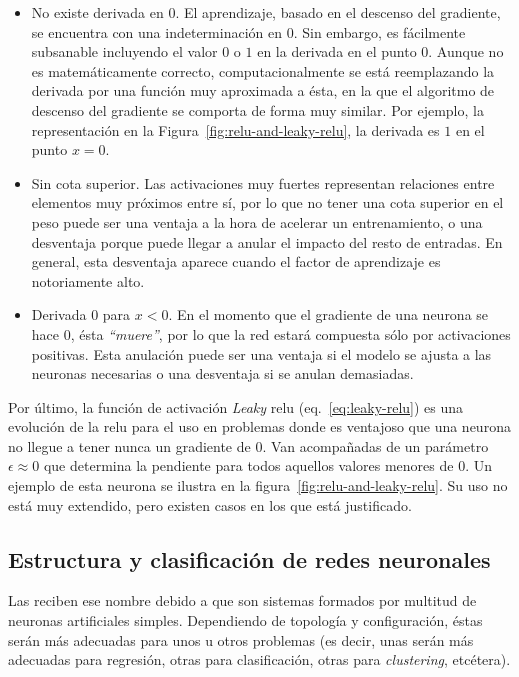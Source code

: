\begin{itemize}
	\item No existe derivada en $0$. El aprendizaje, basado en el descenso del gradiente, se encuentra con una indeterminación en $0$. Sin embargo, es fácilmente subsanable incluyendo el valor $0$ o $1$ en la derivada en el punto $0$. Aunque no es matemáticamente correcto, computacionalmente se está reemplazando la derivada por una función muy aproximada a ésta, en la que el algoritmo de descenso del gradiente se comporta de forma muy similar. Por ejemplo, la representación en la Figura~\ref{fig:relu-and-leaky-relu}, la derivada es $1$ en el punto $x = 0$.
	\item Sin cota superior. Las activaciones muy fuertes representan relaciones entre elementos muy próximos entre sí, por lo que no tener una cota superior en el peso puede ser una ventaja a la hora de acelerar un entrenamiento, o una desventaja porque puede llegar a anular el impacto del resto de entradas. En general, esta desventaja aparece cuando el factor de aprendizaje es notoriamente alto.
	\item Derivada $0$ para $x < 0$. En el momento que el gradiente de una neurona se hace $0$, ésta \textit{\enquote{muere}}, por lo que la red estará compuesta sólo por activaciones positivas. Esta anulación puede ser una ventaja si el modelo se ajusta a las neuronas necesarias o una desventaja si se anulan demasiadas.
\end{itemize}

Por último, la función de activación \textit{Leaky} \gls{relu} (eq.~\ref{eq:leaky-relu}) es una evolución de la \acrshort{relu} para el uso en problemas donde es ventajoso que una neurona no llegue a tener nunca un gradiente de $0$. Van acompañadas de un parámetro $\epsilon \approx 0$ que determina la pendiente para todos aquellos valores menores de $0$. Un ejemplo de esta neurona se ilustra en la figura~\ref{fig:relu-and-leaky-relu}. Su uso no está muy extendido, pero existen casos en los que está justificado.

\subsection{Estructura y clasificación de redes neuronales}

Las  reciben ese nombre debido a que son sistemas formados por multitud de neuronas artificiales simples. Dependiendo de topología y configuración, éstas serán más adecuadas para unos u otros problemas (es decir, unas serán más adecuadas para regresión, otras para clasificación, otras para \textit{clustering}, etcétera).

